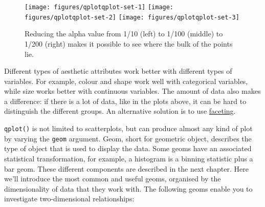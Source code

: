 \begin{Shaded}
\begin{Highlighting}[]
  \NormalTok{(}\NormalTok{/}\NormalTok{))}
  \NormalTok{(}\NormalTok{/}\NormalTok{))}
  \NormalTok{(}\NormalTok{/}\NormalTok{))}
\end{Highlighting}
\end{Shaded}

\begin{figure}
\texttt{[image: figures/qplotqplot-set-1]} \texttt{[image: figures/qplotqplot-set-2]} \texttt{[image: figures/qplotqplot-set-3]} \caption{Reducing the alpha value from 1/10 (left) to 1/100 (middle) to 1/200 (right) makes it possible to see where the bulk of the points lie.\label{fig:qplot-set}}
\end{figure}

Different types of aesthetic attributes work better with different types
of variables. For example, colour and shape work well with categorical
variables, while size works better with continuous variables. The amount
of data also makes a difference: if there is a lot of data, like in the
plots above, it can be hard to distinguish the different groups. An
alternative solution is to use \hyperref[sec:qplot-faceting]{faceting}.


\texttt{qplot()} is not limited to scatterplots, but can produce almost
any kind of plot by varying the \texttt{geom} argument. Geom, short for
geometric object, describes the type of object that is used to display
the data. Some geoms have an associated statistical transformation, for
example, a histogram is a binning statistic plus a bar geom. These
different components are described in the next chapter. Here we'll
introduce the most common and useful geoms, organised by the
dimensionality of data that they work with. The following geoms enable
you to investigate two-dimensional relationships:

